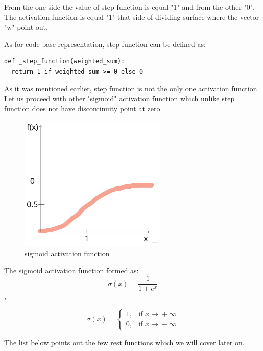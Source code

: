 From the one side the value of step function is equal "1" and from the other "0". The activation function is equal "1" that side of dividing surface where the vector "w" point out.

As for code base representation, step function can be defined as:
\begin{lstlisting}
def _step_function(weighted_sum):
  return 1 if weighted_sum >= 0 else 0
\end{lstlisting}
   
As it was mentioned earlier, step function is not the only one activation function. Let us proceed with other "sigmoid" activation function which unlike step function does not have discontinuity point at zero.
\begin{figure}[h]
    \centering \includegraphics[width=7cm]{images/sigmoid_function.jpg}
    \caption {sigmoid activation function}
\end{figure}

The sigmoid activation function formed as:
\[ \sigma(x) = \dfrac{1}{1+e^x} \],

\[ \sigma(x) = \begin{cases} 1, & \mbox{if } x\mbox{$\xrightarrow{} + \infty$} \\ 0, & \mbox{if } x\mbox{$\xrightarrow{} - \infty$} \end{cases} \]

The list below points out the few rest functions which we will cover later on.


